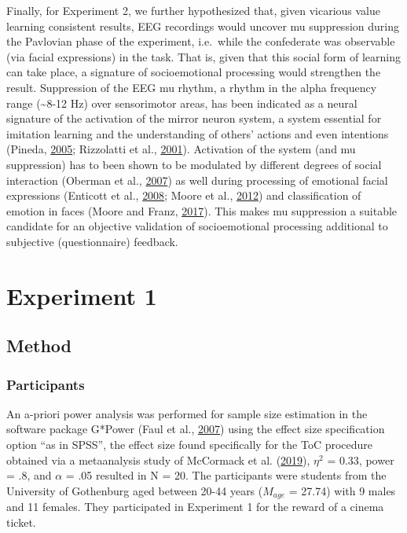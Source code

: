 \documentclass[]{elsarticle} %
\begin{document}
Finally, for Experiment 2, we further hypothesized that, given vicarious
value learning consistent results, EEG recordings would uncover mu
suppression during the Pavlovian phase of the experiment, i.e.~while the
confederate was observable (via facial expressions) in the task. That
is, given that this social form of learning can take place, a signature
of socioemotional processing would strengthen the result. Suppression of
the EEG mu rhythm, a rhythm in the alpha frequency range
(\textasciitilde8-12 Hz) over sensorimotor areas, has been indicated as
a neural signature of the activation of the mirror neuron system, a
system essential for imitation learning and the understanding of others'
actions and even intentions (Pineda,
\protect\hyperlink{ref-PinedaJaimeA2005Tfso}{2005}; Rizzolatti et al.,
\protect\hyperlink{ref-GiacomoRizzolatti2001Nmut}{2001}). Activation of
the system (and mu suppression) has to been shown to be modulated by
different degrees of social interaction (Oberman et al.,
\protect\hyperlink{ref-oberman2007human}{2007}) as well during
processing of emotional facial expressions (Enticott et al.,
\protect\hyperlink{ref-enticott2008mirror}{2008}; Moore et al.,
\protect\hyperlink{ref-MOORE2012309}{2012}) and classification of
emotion in faces (Moore and Franz,
\protect\hyperlink{ref-MooreMatthew2017Mrsi}{2017}). This makes mu
suppression a suitable candidate for an objective validation of
socioemotional processing additional to subjective (questionnaire)
feedback.

\hypertarget{experiment-1}{%
\section{Experiment 1}\label{experiment-1}}

\hypertarget{method}{%
\subsection{Method}\label{method}}

\hypertarget{participants}{%
\subsubsection{Participants}\label{participants}}

An a-priori power analysis was performed for sample size estimation in
the software package G*Power (Faul et al.,
\protect\hyperlink{ref-faul2007g}{2007}) using the effect size
specification option ``as in SPSS'', the effect size found specifically
for the ToC procedure obtained via a metaanalysis study of McCormack et
al. (\protect\hyperlink{ref-mccormack2019quantifying}{2019}), \(\eta^2\)
= 0.33, power = .8, and \(\alpha\) = .05 resulted in N = 20. The
participants were students from the University of Gothenburg aged
between 20-44 years (\(M_{age}\) = 27.74) with 9 males and 11 females.
They participated in Experiment 1 for the reward of a cinema ticket.
\end{document}
